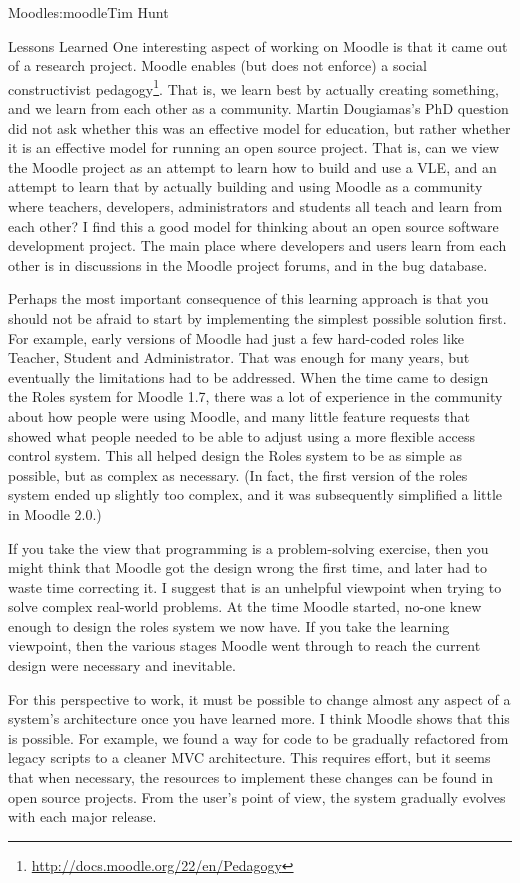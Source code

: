 \begin{aosachapter}{Moodle}{s:moodle}{Tim Hunt}
\begin{aosasect1}{Lessons Learned}
One interesting aspect of working on Moodle is that it came out of a
research project. Moodle enables (but does not enforce) a social
constructivist
pedagogy\footnote{\url{http://docs.moodle.org/22/en/Pedagogy}}. That is,
we learn best by actually creating something, and we learn from each
other as a community. Martin Dougiamas's PhD question did not ask
whether this was an effective model for education, but rather 
whether it is an effective model for running an open source
project. That is, can we view the Moodle project as an attempt to
learn how to build and use a VLE, and an attempt to learn that by
actually building and using Moodle as a community where teachers,
developers, administrators and students all teach and learn from each
other? I find this a good model for thinking about an open source
software development project. The main place where developers and users learn from
each other is in discussions in the Moodle project forums, and in the bug
database.

Perhaps the most important consequence of this learning approach is
that you should not be afraid to start by implementing the simplest
possible solution first. For example, early versions of Moodle had just a few
hard-coded roles like Teacher, Student and Administrator. That was enough
for many years, but eventually the limitations had to be addressed.
When the time came to design the Roles system
for Moodle 1.7, there was a lot of experience in the community about
how people were using Moodle, and many little feature requests
that showed what people needed to be able to adjust using a more flexible access control
system. This all helped design the Roles system to be as simple as
possible, but as complex as necessary. (In fact, the first version of
the roles system ended up slightly too complex, and it was
subsequently simplified a little in Moodle 2.0.)

If you take the view that programming is a problem-solving
exercise, then you might think that Moodle got the design wrong the
first time, and later had to waste time correcting it. I suggest that
is an unhelpful viewpoint when trying to solve complex real-world problems. At the time Moodle started, no-one knew
enough to design the roles system we now have. If you take the
learning viewpoint, then the various stages Moodle went through to reach the current design were
necessary and inevitable.

For this perspective to work, it must be possible to change almost any aspect of a
system's architecture once you have learned more. I think Moodle shows that this is possible.
For example, we found a way for code to be gradually refactored from
legacy scripts to a cleaner MVC architecture. This requires effort, but it seems that when
necessary, the resources to implement these changes can be found in open source projects. From the user's point of view, the system gradually
evolves with each major release.

\end{aosasect1}

\end{aosachapter}
